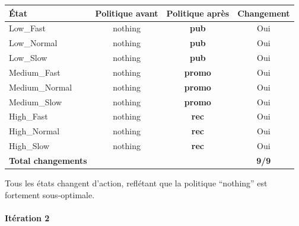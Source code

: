 \documentclass[11pt,a4paper]{article}
\renewcommand{\arraystretch}{1.35}
\begin{document}
\begin{center}
\renewcommand{\arraystretch}{1.3}
\begin{tabular}{l|cc|c}
\toprule
\textbf{État} & \textbf{Politique avant} & \textbf{Politique après} & \textbf{Changement} \\
\midrule
\rowcolor{LightBlue}
Low\_Fast & nothing & \textbf{pub} & Oui \\
Low\_Normal & nothing & \textbf{pub} & Oui \\
Low\_Slow & nothing & \textbf{pub} & Oui \\
\rowcolor{LightOrange}
Medium\_Fast & nothing & \textbf{promo} & Oui \\
Medium\_Normal & nothing & \textbf{promo} & Oui \\
Medium\_Slow & nothing & \textbf{promo} & Oui \\
\rowcolor{LightRed}
High\_Fast & nothing & \textbf{rec} & Oui \\
High\_Normal & nothing & \textbf{rec} & Oui \\
High\_Slow & nothing & \textbf{rec} & Oui \\
\hline
\textbf{Total changements} & & & \textbf{9/9} \\
\bottomrule
\end{tabular}
\end{center}
 
Tous les états changent d'action, reflétant que la politique ``nothing'' est
fortement sous-optimale.
 
\paragraph{Itération 2}
 
\end{document}
